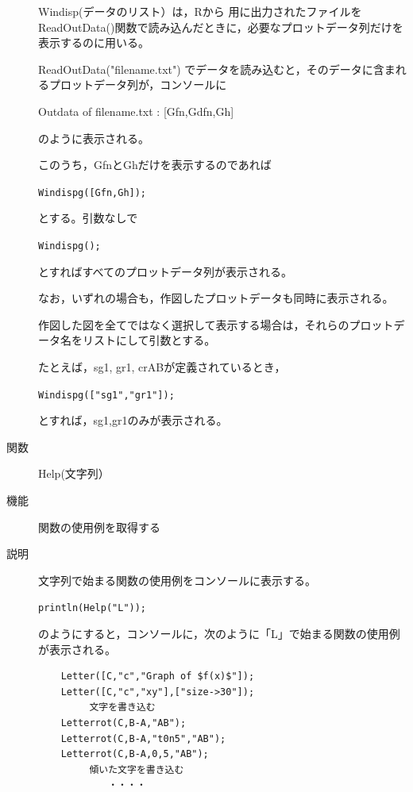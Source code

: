 \documentclass[papersize,a4paper,12pt,uplatex]{jsarticle}
\begin{document}
\begin{description}
Windisp(データのリスト）は，Rから \ketcindy 用に出力されたファイルを ReadOutData()関数で読み込んだときに，必要なプロットデータ列だけを表示するのに用いる。
  
ReadOutData("filename.txt") でデータを読み込むと，そのデータに含まれるプロットデータ列が，コンソールに

\hspace{10mm}Outdata of filename.txt : [Gfn,Gdfn,Gh] 

のように表示される。

このうち，GfnとGhだけを表示するのであれば

\hspace{10mm}\verb|Windispg([Gfn,Gh]);|

とする。引数なしで
 
\hspace{10mm}\verb|Windispg();|

とすればすべてのプロットデータ列が表示される。

なお，いずれの場合も，作図したプロットデータも同時に表示される。

作図した図を全てではなく選択して表示する場合は，それらのプロットデータ名をリストにして引数とする。

たとえば，sg1, gr1, crABが定義されているとき，

\hspace{10mm}\verb|Windispg(["sg1","gr1"]);|
        
とすれば，sg1,gr1のみが表示される。


\vspace{\baselineskip}
\hypertarget{help}{}
\item[関数]  Help(文字列）
\item[機能]  関数の使用例を取得する
\item[説明]  文字列で始まる関数の使用例をコンソールに表示する。

\hspace{10mm} \verb|println(Help("L"));|
    
  のようにすると，コンソールに，次のように「L」で始まる関数の使用例が表示される。
\begin{verbatim}
    Letter([C,"c","Graph of $f(x)$"]); 
    Letter([C,"c","xy"],["size->30"]); 
         文字を書き込む 
    Letterrot(C,B-A,"AB"); 
    Letterrot(C,B-A,"t0n5","AB"); 
    Letterrot(C,B-A,0,5,"AB"); 
         傾いた文字を書き込む 
         　　・・・・
\end{verbatim}


\end{description}
\end{document}
